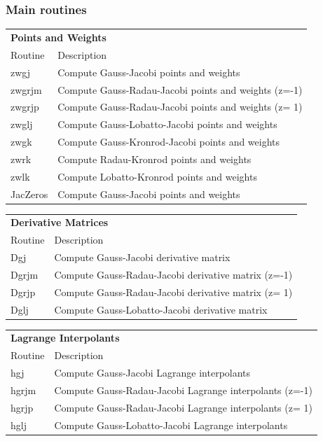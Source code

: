\subsubsection{Main routines}
\begin{tabular}{ll}
\toprule
\multicolumn{2}{l}{\textbf{Points and Weights}} \\
Routine & Description \\
\midrule
zwgj & Compute Gauss-Jacobi points and weights \\
zwgrjm & Compute Gauss-Radau-Jacobi points and weights (z=-1) \\
zwgrjp & Compute Gauss-Radau-Jacobi points and weights (z= 1) \\
zwglj & Compute Gauss-Lobatto-Jacobi points and weights \\
zwgk & Compute Gauss-Kronrod-Jacobi points and weights \\
zwrk & Compute Radau-Kronrod points and weights \\
zwlk & Compute Lobatto-Kronrod points and weights \\
JacZeros & Compute Gauss-Jacobi points and weights \\
\bottomrule
\end{tabular}

\begin{tabular}{ll}
\toprule
\multicolumn{2}{l}{\textbf{Derivative Matrices}} \\
Routine & Description \\
\midrule
Dgj & Compute Gauss-Jacobi derivative matrix \\
Dgrjm & Compute Gauss-Radau-Jacobi derivative matrix (z=-1) \\
Dgrjp & Compute Gauss-Radau-Jacobi derivative matrix (z= 1) \\
Dglj & Compute Gauss-Lobatto-Jacobi derivative matrix \\
\bottomrule
\end{tabular}

\begin{tabular}{ll}
\toprule
\multicolumn{2}{l}{\textbf{Lagrange Interpolants}} \\
Routine & Description \\
\midrule
hgj & Compute Gauss-Jacobi Lagrange interpolants \\
hgrjm & Compute Gauss-Radau-Jacobi Lagrange interpolants (z=-1) \\
hgrjp & Compute Gauss-Radau-Jacobi Lagrange interpolants (z= 1) \\
hglj & Compute Gauss-Lobatto-Jacobi Lagrange interpolants \\
\bottomrule
\end{tabular}

